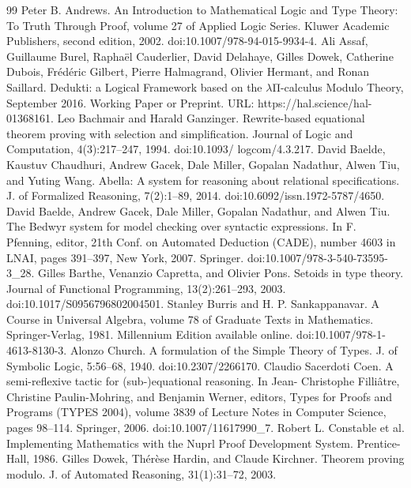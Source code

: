\documentclass[10pt,a4paper]{article}
\begin{document}
\begin{thebibliography}{99}
 Peter B. Andrews. An Introduction to Mathematical Logic and Type Theory: To Truth Through Proof, volume 27 of Applied Logic Series. Kluwer Academic Publishers, second edition, 2002. doi:10.1007/978-94-015-9934-4.
 Ali Assaf, Guillaume Burel, Raphaël Cauderlier, David Delahaye, Gilles Dowek, Catherine Dubois, Frédéric Gilbert, Pierre Halmagrand, Olivier Hermant, and Ronan Saillard. Dedukti: a Logical Framework based on the \ensuremath{\lambda}Π-calculus Modulo Theory, September 2016. Working Paper or Preprint. URL: https://hal.science/hal-01368161.
 Leo Bachmair and Harald Ganzinger. Rewrite-based equational theorem proving with selection and simplification. Journal of Logic and Computation, 4(3):217–247, 1994. doi:10.1093/ logcom/4.3.217.
 David Baelde, Kaustuv Chaudhuri, Andrew Gacek, Dale Miller, Gopalan Nadathur, Alwen Tiu, and Yuting Wang. Abella: A system for reasoning about relational specifications. J. of Formalized Reasoning, 7(2):1–89, 2014. doi:10.6092/issn.1972-5787/4650.
 David Baelde, Andrew Gacek, Dale Miller, Gopalan Nadathur, and Alwen Tiu. The Bedwyr system for model checking over syntactic expressions. In F. Pfenning, editor, 21th Conf. on Automated Deduction (CADE), number 4603 in LNAI, pages 391–397, New York, 2007. Springer. doi:10.1007/978-3-540-73595-3\_28.
 Gilles Barthe, Venanzio Capretta, and Olivier Pons. Setoids in type theory. Journal of Functional Programming, 13(2):261–293, 2003. doi:10.1017/S0956796802004501.
 Stanley Burris and H. P. Sankappanavar. A Course in Universal Algebra, volume 78 of Graduate Texts in Mathematics. Springer-Verlag, 1981. Millennium Edition available online. doi:10.1007/978-1-4613-8130-3.
 Alonzo Church. A formulation of the Simple Theory of Types. J. of Symbolic Logic, 5:56–68, 1940. doi:10.2307/2266170.
 Claudio Sacerdoti Coen. A semi-reflexive tactic for (sub-)equational reasoning. In Jean- Christophe Filliâtre, Christine Paulin-Mohring, and Benjamin Werner, editors, Types for Proofs and Programs (TYPES 2004), volume 3839 of Lecture Notes in Computer Science, pages 98–114. Springer, 2006. doi:10.1007/11617990\_7.
 Robert L. Constable et al. Implementing Mathematics with the Nuprl Proof Development System. Prentice-Hall, 1986.
 Gilles Dowek, Thérèse Hardin, and Claude Kirchner. Theorem proving modulo. J. of Automated Reasoning, 31(1):31–72, 2003.

\end{thebibliography}
\end{document}
